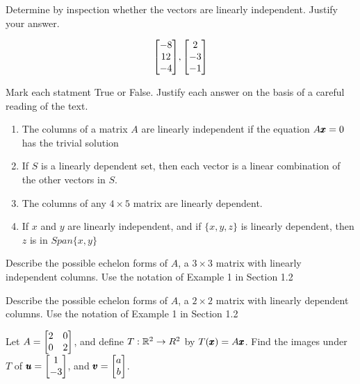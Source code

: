 \documentclass{../mathhomework}
\newcommand{\Span}[1]{\textit{Span}\{#1\}}
\newenvironment{Mat}{\begin{bmatrix}}{\end{bmatrix}}
\begin{document}
\begin{problem}[1.7\#19]
    Determine by inspection whether the vectors are linearly independent. Justify your answer.

    \begin{equation*}
        \begin{Mat}
            -8 \\ 12 \\ -4
        \end{Mat},
        \begin{Mat}
            2 \\ -3 \\ -1
        \end{Mat}
    \end{equation*}
\end{problem}

\begin{problem}[1.7\#21]
    Mark each statment True or False. Justify each answer on the basis of a careful reading of the text.
    
    \begin{enumerate}
        \item The columns of a matrix $A$ are linearly independent if the equation $A\pmb{x} = 0$ has the trivial solution
        \item If $S$ is a linearly dependent set, then each vector is a linear combination of the other vectors in $S$.
        \item The columns of any $4 \times 5$ matrix are linearly dependent.
        \item If $x$ and $y$ are linearly independent, and if $\{x,y,z\}$ is linearly dependent, then $z$ is in $\Span{x,y}$
    \end{enumerate}
\end{problem}

\begin{problem}[1.7\#23]
    Describe the possible echelon forms of $A$, a $3 \times 3$ matrix with linearly independent columns. Use the notation of Example 1 in Section 1.2
\end{problem}

\begin{problem}[1.7\#25]
    Describe the possible echelon forms of $A$, a $2 \times 2$ matrix with linearly dependent columns. Use the notation of Example 1 in Section 1.2
\end{problem}

\begin{problem}[1.8\#1]
    Let $A = \begin{Mat}
        2 & 0 \\
        0 & 2
    \end{Mat}$, and define $T: \mathbb{R}^2 \to R^2$ by $T(\pmb{x}) = A\pmb{x}$. Find the images under $T$ of $\Vect{u} = \begin{Mat}
        1 \\ -3
    \end{Mat}$, and $\Vect{v} = \begin{Mat}
        a \\ b
    \end{Mat}$.
\end{problem}
\end{document}
